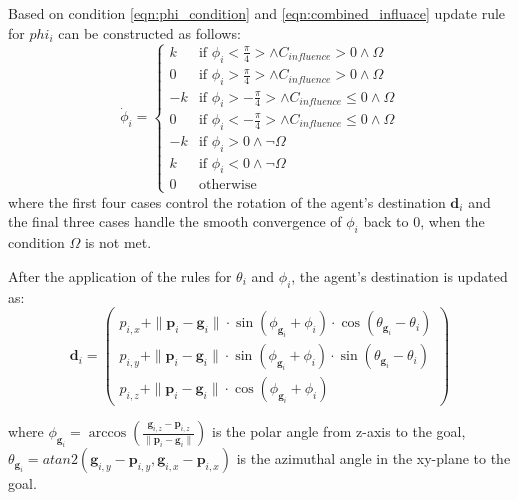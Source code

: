         Based on condition \eqref{eqn:phi_condition} and \eqref{eqn:combined_influace} update rule for $phi_i$ can be constructed as follows:
        \begin{equation}
            \label{eqn:phi_update}
            \dot{\phi}_i = 
            \begin{cases}
                k  & \text{if } \phi_i < \frac{\pi}{4} > \land C_{influence} > 0 \land \Omega \\
                0  & \text{if } \phi_i > \frac{\pi}{4} > \land C_{influence} > 0 \land \Omega \\
                -k & \text{if } \phi_i > -\frac{\pi}{4} > \land C_{influence} \leq 0 \land \Omega \\
                0  & \text{if } \phi_i < -\frac{\pi}{4} > \land C_{influence} \leq 0 \land \Omega \\
                -k & \text{if } \phi_i > 0 \land \neg \Omega \\
                k  & \text{if } \phi_i < 0 \land \neg \Omega \\
                0  & \text{otherwise}
            \end{cases}
        \end{equation}
        where the first four cases control the rotation of the agent's destination $\mathbf{d}_i$ and the final three cases handle the smooth convergence of $\phi_i$ back to 0, when the condition $\Omega$ is not met. 

        After the application of the rules for $\theta_i$ and $\phi_i$, the agent's destination is updated as:
        \begin{equation}
            \label{eqn:destination_update}
            \mathbf{d}_i =
            \begin{pmatrix}
                p_{i,x} +  \|\mathbf{p}_i - \mathbf{g}_i\| \cdot \sin(\phi_{\mathbf{g}_i} + \phi_i) \cdot \cos(\theta_{\mathbf{g}_i} - \theta_i) \\
                p_{i,y} + \|\mathbf{p}_i - \mathbf{g}_i\| \cdot \sin(\phi_{\mathbf{g}_i} + \phi_i) \cdot \sin(\theta_{\mathbf{g}_i} - \theta_i) \\
                p_{i,z} + \|\mathbf{p}_i - \mathbf{g}_i\| \cdot \cos(\phi_{\mathbf{g}_i} + \phi_i)
            \end{pmatrix}
        \end{equation}

        where $\phi_{\mathbf{g}_i} = \arccos(\frac{\mathbf{g}_{i,z} - \mathbf{p}_{i,z}}{\|\mathbf{p}_i - \mathbf{g}_i\|})$ is the polar angle from z-axis to the goal, 
        $\theta_{\mathbf{g}_i} = atan2( \mathbf{g}_{i,y} - \mathbf{p}_{i,y}, \mathbf{g}_{i,x} - \mathbf{p}_{i,x})$ is the azimuthal angle in the xy-plane to the goal.
    
